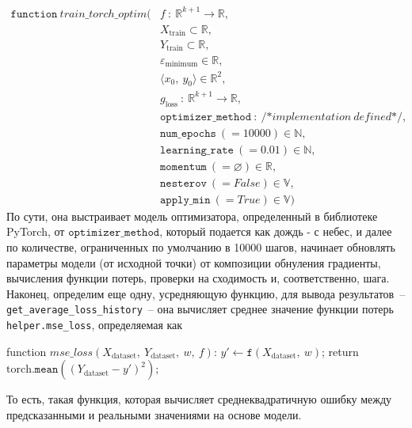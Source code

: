 \documentclass[12pt, a4paper, oneside, final]{article}
\begin{document}
	\begin{align*}
		\mathtt{function}~train\_torch\_optim(&f\ :\ \mathbb{R}^{k + 1} \to \mathbb{R}, \\
		& X_{\text{train}} \subset \mathbb{R}, \\
		& Y_{\text{train}} \subset \mathbb{R}, \\
		& \varepsilon_{\text{minimum}} \in \mathbb{R}, \\
		& \langle x_0, ~ y_0 \rangle \in \mathbb{R}^2, \\
		& g_{\text{loss}}\ :\ \mathbb{R}^{k + 1} \to \mathbb{R}, \\
		& \mathtt{optimizer\_method}\ :\ \text{/*}implementation~defined\text{*/}, \\
		& \mathtt{num\_epochs}~(= 10000) \in \mathbb{N}, \\
		& \mathtt{learning\_rate}~(= 0.01) \in \mathbb{N}, \\
		& \mathtt{momentum}~(= \varnothing) \in \mathbb{R}, \\
		& \mathtt{nesterov}~(= \textit{False}) \in \mathbb{V}, \\
		& \mathtt{apply\_min}~(= \textit{True}) \in \mathbb{V})
	\end{align*}
	По сути, она выстраивает модель оптимизатора, определенный в библиотеке PyTorch, от $\mathtt{optimizer\_method}$, который подается как дождь - с небес, и далее по количестве, ограниченных по умолчанию в 10000 шагов, начинает обновлять параметры модели (от исходной точки) от композиции обнуления градиенты, вычисления функции потерь, проверки на сходимость и, соответственно, шага.
	Наконец, определим еще одну, усредняющую функцию, для вывода результатов~-- \texttt{get\_average\_loss\_history}~-- она вычисляет среднее значение функции потерь \texttt{helper.mse\_loss}, определяемая как
	\begin{mylisting}
function $mse\_loss(X_{\text{dataset}}, ~ Y_{\text{dataset}}, ~ w, ~ f)$:
	$y' \gets \mathtt{f}(X_{\text{dataset}}, ~ w)$;
	return $\text{torch}.\mathtt{mean}((Y_{\text{dataset}} - y')^2)$;
	\end{mylisting}
	То есть, такая функция, которая вычисляет среднеквадратичную ошибку между предсказанными и реальными значениями на основе модели.
\end{document}
